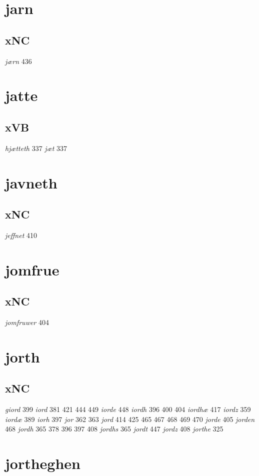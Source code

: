 \documentclass[a4paper,twocolumn]{article}
\begin{document}
\section{jarn}
\label{sec:org287ca9b}
\subsection{xNC}
\label{sec:org0c4bb68}
\emph{jærn} 436 
\section{jatte}
\label{sec:org309acb3}
\subsection{xVB}
\label{sec:org831a086}
\emph{hjætteth} 337 \emph{jæt} 337 
\section{javneth}
\label{sec:orgce44332}
\subsection{xNC}
\label{sec:org0cd262a}
\emph{jeffnet} 410 
\section{jomfrue}
\label{sec:orgc2368ab}
\subsection{xNC}
\label{sec:orgc035356}
\emph{jomfruwer} 404 
\section{jorth}
\label{sec:orgaf9b681}
\subsection{xNC}
\label{sec:org43f401b}
\emph{giord} 399 \emph{iord} 381 421 444 449 \emph{iorde} 448 \emph{iordh} 396 400 404 \emph{iordhæ} 417 \emph{iordz} 359 \emph{iordæ} 389 \emph{iorh} 397 \emph{jor} 362 363 \emph{jord} 414 425 465 467 468 469 470 \emph{jorde} 405 \emph{jorden} 468 \emph{jordh} 365 378 396 397 408 \emph{jordhs} 365 \emph{jordt} 447 \emph{jordz} 408 \emph{jorthe} 325 
\section{jortheghen}
\label{sec:org2dcb59a}
\end{document}
